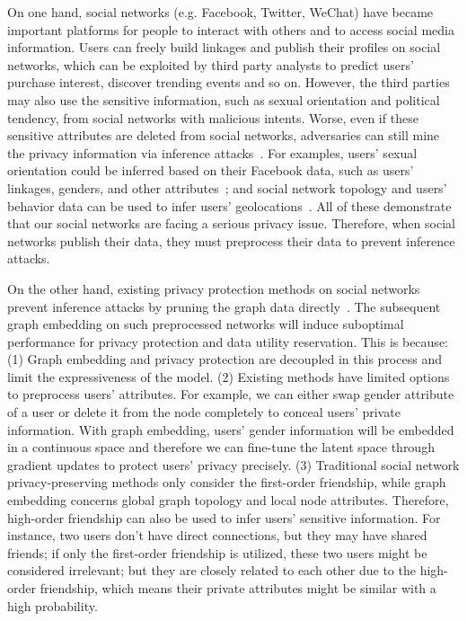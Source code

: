 \documentclass{article}
\begin{document}
On one hand, social networks (e.g. Facebook, Twitter, WeChat) have became important platforms for people to interact with others and to access social media information. Users can freely build linkages and publish their profiles on social networks, which can be exploited by third party analysts to predict users' purchase interest, discover trending events and so on. However, the third parties may also use the sensitive information, such as sexual orientation and political tendency, from social networks with malicious intents. Worse, even if these sensitive attributes are deleted from social networks, adversaries can still mine the privacy information via inference attacks~\citep{lindamood2009inferring}. For examples, users' sexual orientation could be inferred based on their Facebook data, such as users' linkages, genders, and other attributes~\cite{jernigan2009gaydar}; and social network topology and users' behavior data can be used to infer users' geolocations~\cite{gong2018attribute}. All of these demonstrate that our social networks are facing a serious privacy issue. Therefore, when social networks publish their data, they must preprocess their data to prevent inference attacks.



On the other hand, existing privacy protection methods on social networks prevent inference attacks by pruning the graph data directly~\citep{cai2018collective,he2018latent}. The subsequent graph embedding on such preprocessed networks will induce suboptimal performance for privacy protection and data utility reservation. This is because:
(1) Graph embedding and privacy protection are decoupled in this process and limit the expressiveness of the model. (2) Existing methods have limited options to preprocess users' attributes. For example, we can either swap gender attribute of a user or delete it from the node completely to conceal users' private information. With graph embedding, users' gender information will be embedded in a continuous space and therefore we can fine-tune the latent space through gradient updates to protect users' privacy precisely. (3) Traditional social network privacy-preserving methods only consider the first-order friendship, while graph embedding concerns global graph topology and local node attributes. Therefore, high-order friendship can also be used to infer users' sensitive information. For instance, two users don't have direct connections, but they may have shared friends; if only the first-order friendship is utilized, these two users might be considered irrelevant; but they are closely related to each other due to the high-order friendship, which means their private attributes might be similar with a high probability.
\end{document}
